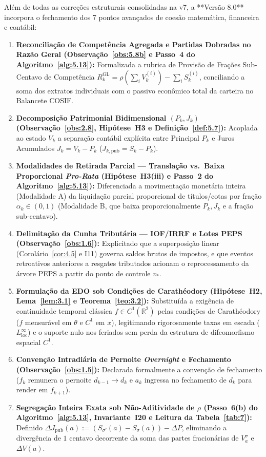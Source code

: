 \documentclass[11pt, a4paper]{article}
\theoremstyle{definition}
\theoremstyle{plain}
\theoremstyle{remark}
\begin{document}
Além de todas as correções estruturais consolidadas na v7, a **Versão 8.0** incorpora o fechamento dos 7 pontos avançados de coesão matemática, financeira e contábil:
\begin{enumerate}[label=\textbf{\arabic*.}]
    \item \textbf{Reconciliação de Competência Agregada e Partidas Dobradas no Razão Geral (Observação~\ref{obs:5.8b} e Passo~4 do Algoritmo~\ref{alg:5.13}):} Formalizada a rubrica de Provisão de Frações Sub-Centavo de Competência $R_k^{\text{GL}} = \rho(\sum_i V_k^{(i)}) - \sum_i S_k^{(i)}$, conciliando a soma dos extratos individuais com o passivo econômico total da carteira no Balancete COSIF.
    \item \textbf{Decomposição Patrimonial Bidimensional $(P_k, J_k)$ (Observação~\ref{obs:2.8}, Hipótese~H3 e Definição~\ref{def:5.7}):} Acoplada ao estado $V_k$ a separação contábil explícita entre Principal $P_k$ e Juros Acumulados $J_k = V_k - P_k$ ($J_{k,\text{pub}} = S_k - P_k$).
    \item \textbf{Modalidades de Retirada Parcial --- Translação vs.\ Baixa Proporcional \emph{Pro-Rata} (Hipótese~H3(iii) e Passo~2 do Algoritmo~\ref{alg:5.13}):} Diferenciada a movimentação monetária inteira (Modalidade A) da liquidação parcial proporcional de títulos/cotas por fração $\alpha_k \in (0, 1)$ (Modalidade B, que baixa proporcionalmente $P_k, J_k$ e a fração sub-centavo).
    \item \textbf{Delimitação da Cunha Tributária --- IOF/IRRF e Lotes PEPS (Observação~\ref{obs:1.6}):} Explicitado que a superposição linear (Corolário~\ref{cor:4.5} e I11) governa saldos brutos de impostos, e que eventos retroativos anteriores a resgates tributados acionam o reprocessamento da árvore PEPS a partir do ponto de controle $v_*$.
    \item \textbf{Formulação da EDO sob Condições de Carathéodory (Hipótese~H2, Lema~\ref{lem:3.1} e Teorema~\ref{teo:3.2}):} Substituída a exigência de continuidade temporal clássica $f \in C^1(\mathbb{R}^2)$ pelas condições de Carathéodory ($f$ mensurável em $\theta$ e $C^1$ em $x$), legitimando rigorosamente taxas em escada ($L^\infty_{\text{loc}}$) e o suporte nulo nos feriados sem perda da estrutura de difeomorfismo espacial $C^1$.
    \item \textbf{Convenção Intradiária de Pernoite \emph{Overnight} e Fechamento (Observação~\ref{obs:1.5}):} Declarada formalmente a convenção de fechamento ($f_k$ remunera o pernoite $d_{k-1} \to d_k$ e $a_k$ ingressa no fechamento de $d_k$ para render em $f_{k+1}$).
    \item \textbf{Segregação Inteira Exata sob Não-Aditividade de $\rho$ (Passo~6(b) do Algoritmo~\ref{alg:5.13}, Invariante~I20 e Leitura da Tabela~\ref{tab:7}):} Definido $\Delta J_{\text{pub}}(a) := (S_{\sigma'}(a) - S_\sigma(a)) - \Delta P$, eliminando a divergência de $1$ centavo decorrente da soma das partes fracionárias de $V_a^\sigma$ e $\Delta V(a)$.
\end{enumerate}
\end{document}
